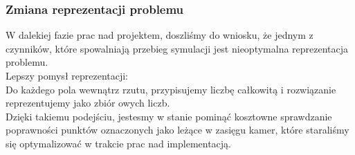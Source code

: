 \documentclass[12pt,a4paper]{article}
\begin{document}
\subsubsection{Zmiana reprezentacji problemu}
W dalekiej fazie prac nad projektem, doszliśmy do wniosku, że jednym z czynników, które spowalniają przebieg symulacji jest nieoptymalna reprezentacja problemu.\\
Lepszy pomysł reprezentacji: \\
Do każdego pola wewnątrz rzutu, przypisujemy liczbę całkowitą i rozwiązanie reprezentujemy jako zbiór owych liczb. \\
Dzięki takiemu podejściu, jestesmy w stanie pominąć kosztowne sprawdzanie poprawności punktów oznaczonych jako leżące w zasięgu kamer, które staraliśmy się optymalizować w trakcie prac nad implementacją.
\end{document}
